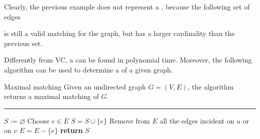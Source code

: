 \documentclass[a4paper, 12pt]{report}
\begin{document}
    Clearly, the previous example does not represent a , because the following set of edges

    \begin{figure}[H]
        \centering
    \end{figure}

    is still a valid matching for the graph, but has a larger cardinality than the previous set.

    Differently from VC, a  can be found in polynomial time. Moreover, the following algorithm can be used to determine a  of a given graph.

    \begin{framedalgo}{Maximal matching}
        Given an undirected graph $G = (V, E)$, the algorithm returns a maximal matching of $G$. \\
        \hrule

        \quad
        \begin{algorithmic}[1]
                \State $S := \varnothing$
                    \State Choose $e\in E$
                    \State $S = S \cup \{e\}$
                    \State Remove from $E$ all the edges incident on $u$ or on $v$
                    \State $E = E - \{e\}$
                \EndWhile
                \State \textbf{return} $S$
            \EndFunction
        \end{algorithmic}
    \end{framedalgo}
\end{document}
